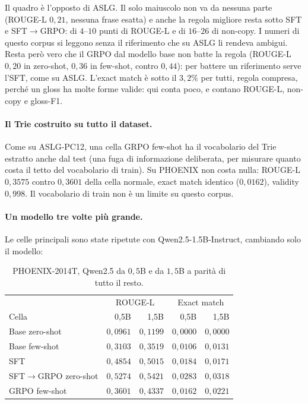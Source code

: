 Il quadro è l'opposto di ASLG. Il solo maiuscolo non va da nessuna parte
(ROUGE-L $0{,}21$, nessuna frase esatta) e anche la regola migliore resta sotto
SFT e SFT$\to$GRPO: di $4$--$10$ punti di ROUGE-L e di $16$--$26$ di
non-copy. I numeri di questo corpus si leggono senza il riferimento che su ASLG
li rendeva ambigui. Resta però vero che il GRPO dal modello base non batte la
regola (ROUGE-L $0{,}20$ in zero-shot, $0{,}36$ in few-shot, contro $0{,}44$): per
battere un riferimento serve l'SFT, come su ASLG. L'exact match è sotto il
$3{,}2\%$ per tutti, regola compresa, perché un gloss ha molte forme valide: qui
conta poco, e contano ROUGE-L, non-copy e gloss-F1.

\paragraph{Il Trie costruito su tutto il dataset.} Come su ASLG-PC12, una cella
GRPO few-shot ha il vocabolario del Trie estratto anche dal test (una fuga di
informazione deliberata, per misurare quanto costa il tetto del vocabolario di
train). Su PHOENIX non costa nulla: ROUGE-L $0{,}3575$ contro $0{,}3601$ della
cella normale, exact match identico ($0{,}0162$), validity $0{,}998$. Il
vocabolario di train non è un limite su questo corpus.

\paragraph{Un modello tre volte più grande.} Le celle principali sono state
ripetute con Qwen2.5-1.5B-Instruct, cambiando solo il modello:

\begin{table}[h]
\centering
\small
\begin{tabular}{lrrrr}
\toprule
 & \multicolumn{2}{c}{ROUGE-L} & \multicolumn{2}{c}{Exact match} \\
Cella & 0,5B & 1,5B & 0,5B & 1,5B \\
\midrule
Base zero-shot         & $0{,}0961$ & $0{,}1199$ & $0{,}0000$ & $0{,}0000$ \\
Base few-shot          & $0{,}3103$ & $0{,}3519$ & $0{,}0106$ & $0{,}0131$ \\
SFT                    & $0{,}4854$ & $0{,}5015$ & $0{,}0184$ & $0{,}0171$ \\
SFT$\to$GRPO zero-shot & $0{,}5274$ & $0{,}5421$ & $0{,}0283$ & $0{,}0318$ \\
GRPO few-shot          & $0{,}3601$ & $0{,}4337$ & $0{,}0162$ & $0{,}0221$ \\
\bottomrule
\end{tabular}
\caption{PHOENIX-2014T, Qwen2.5 da $0{,}5$B e da $1{,}5$B a parità di tutto il
resto.}
\label{tab:phoenix-15b}
\end{table}

